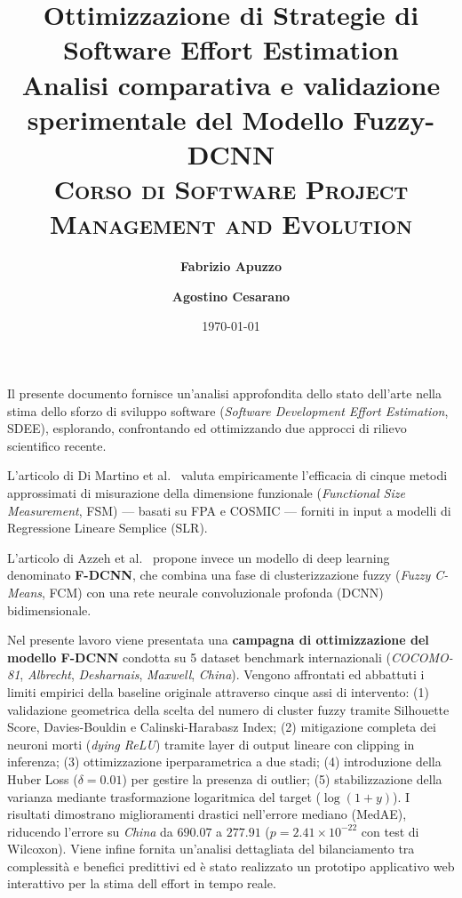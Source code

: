 \documentclass[11pt, a4paper]{article}
\title{
  \vspace{-1em}
  {\Huge\fontfamily{phv}\selectfont\bfseries\color{navyblue} Ottimizzazione di Strategie di \\ Software Effort Estimation} \\[0.4em]
  {\Large\fontfamily{phv}\selectfont\color{slategray} Analisi comparativa e validazione sperimentale del Modello Fuzzy-DCNN} \\[0.5em]
  {\small\fontfamily{phv}\selectfont\color{accentblue}\scshape Corso di Software Project Management and Evolution}
  \vspace{0.5em}
}
\author{\textbf{\Large Fabrizio Apuzzo} \quad \and \quad \textbf{\Large Agostino Cesarano}}
\date{\vspace{0.5em}\large\color{slategray} \today}
\begin{document}
\maketitle

\vspace{0.5em}

\begin{summarybox}[title=Abstract]
    \vspace{0.5em}
    Il presente documento fornisce un'analisi approfondita dello stato dell'arte nella stima dello sforzo di sviluppo software (\textit{Software Development Effort Estimation}, SDEE), esplorando, confrontando ed ottimizzando due approcci di rilievo scientifico recente.

    L'articolo di Di Martino et al.~\cite{DIMARTINO2020106308} valuta empiricamente
    l'efficacia di cinque metodi approssimati di misurazione della dimensione
    funzionale (\textit{Functional Size Measurement}, FSM) --- basati su FPA e
    COSMIC --- forniti in input a modelli di Regressione Lineare Semplice (SLR).

    L'articolo di Azzeh et al.~\cite{article} propone invece un modello di deep
    learning denominato \textbf{F-DCNN}, che combina una fase di clusterizzazione
    fuzzy (\textit{Fuzzy C-Means}, FCM) con una rete neurale convoluzionale
    profonda (DCNN) bidimensionale.

    Nel presente lavoro viene presentata una \textbf{campagna di ottimizzazione del
        modello F-DCNN} condotta su 5 dataset benchmark internazionali
    (\textit{COCOMO-81}, \textit{Albrecht}, \textit{Desharnais}, \textit{Maxwell},
    \textit{China}). Vengono affrontati ed abbattuti i limiti empirici della
    baseline originale attraverso cinque assi di intervento: (1) validazione
    geometrica della scelta del numero di cluster fuzzy tramite Silhouette Score,
    Davies-Bouldin e Calinski-Harabasz Index; (2) mitigazione completa dei neuroni
    morti (\textit{dying ReLU}) tramite layer di output lineare con clipping in
    inferenza; (3) ottimizzazione iperparametrica a due stadi; (4) introduzione
    della Huber Loss ($\delta=0.01$) per gestire la presenza di outlier; (5)
    stabilizzazione della varianza mediante trasformazione logaritmica del target
    ($\log(1+y)$). I risultati dimostrano miglioramenti drastici nell'errore
    mediano (MedAE), riducendo l'errore su \textit{China} da $690.07$ a $277.91$
    ($p = 2.41 \times 10^{-22}$ con test di Wilcoxon). Viene infine fornita
    un'analisi dettagliata del bilanciamento tra complessità e benefici predittivi
    ed è stato realizzato un prototipo applicativo web interattivo per la stima
    dell effort in tempo reale.
\end{summarybox}
\end{document}
